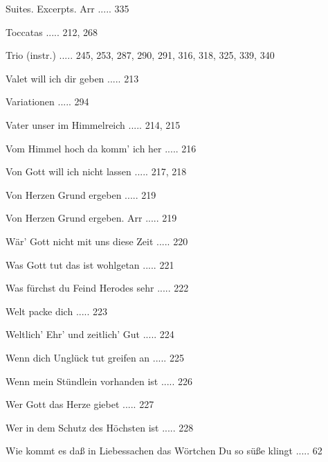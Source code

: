 \documentclass[twocolumn]{book}
\begin{document}
\newline 
Suites. Excerpts. Arr ..... 335

\newline 
Toccatas ..... 212, 268

\newline 
Trio (instr.) ..... 245, 253, 287, 290, 291, 316, 318, 325, 339, 340

\newline 
Valet will ich dir geben ..... 213

\newline 
Variationen ..... 294

\newline 
Vater unser im Himmelreich ..... 214, 215

\newline 
Vom Himmel hoch da komm' ich her ..... 216

\newline 
Von Gott will ich nicht lassen ..... 217, 218

\newline 
Von Herzen Grund ergeben ..... 219

\newline 
Von Herzen Grund ergeben. Arr ..... 219

\newline 
Wär' Gott nicht mit uns diese Zeit ..... 220

\newline 
Was Gott tut das ist wohlgetan ..... 221

\newline 
Was fürchst du Feind Herodes sehr ..... 222

\newline 
Welt packe dich ..... 223

\newline 
Weltlich' Ehr' und zeitlich' Gut ..... 224

\newline 
Wenn dich Unglück tut greifen an ..... 225

\newline 
Wenn mein Stündlein vorhanden ist ..... 226

\newline 
Wer Gott das Herze giebet ..... 227

\newline 
Wer in dem Schutz des Höchsten ist ..... 228

\newline 
Wie kommt es daß in Liebessachen das Wörtchen Du so süße klingt ..... 62
\end{document}
